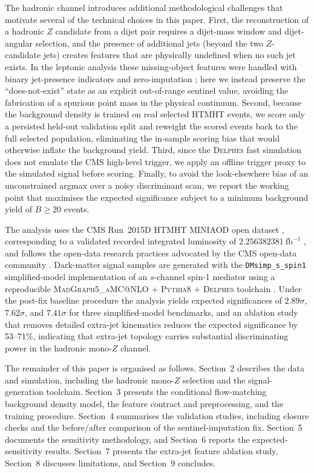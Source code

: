 \documentclass[11pt,a4paper,twocolumn]{article}
\newcommand{\invfb}{\ensuremath{\mathrm{fb}^{-1}}}
\begin{document}
The hadronic channel introduces additional methodological challenges that
motivate several of the technical choices in this paper. First, the
reconstruction of a hadronic $Z$ candidate from a dijet pair requires a
dijet-mass window and dijet-angular selection, and the presence of additional
jets (beyond the two $Z$-candidate jets) creates features that are
physically undefined when no such jet exists. In the leptonic analysis these
missing-object features were handled with binary jet-presence indicators and
zero-imputation \cite{rasineni_nsf_monoz}; here we instead preserve the
``does-not-exist'' state as an explicit out-of-range sentinel value, avoiding
the fabrication of a spurious point mass in the physical continuum. Second,
because the background density is trained on real selected HTMHT events, we
score only a persisted held-out validation split and reweight the scored
events back to the full selected population, eliminating the in-sample
scoring bias that would otherwise inflate the background yield. Third, since
the \textsc{Delphes} fast simulation does not emulate the CMS high-level
trigger, we apply an offline trigger proxy to the simulated signal before
scoring. Finally, to avoid the look-elsewhere bias of an unconstrained
argmax over a noisy discriminant scan, we report the working point that
maximises the expected significance subject to a minimum background yield of
$B\geq20$ events.

The analysis uses the CMS Run~2015D HTMHT MINIAOD open dataset
\cite{cms_htmht_2015d}, corresponding to a validated recorded integrated
luminosity of $2.256382381~\invfb$ \cite{cms_data_policy,cms_lumi_guide},
and follows the open-data research practices advocated by the CMS open-data
community \cite{lassila_cms_opendata,bellis_cms_dp}. Dark-matter signal
samples are generated with the \texttt{DMsimp\_s\_spin1} simplified-model
implementation of an $s$-channel spin-1 mediator
\cite{abercrombie_dm_forum,backovic_schannel} using a reproducible
\textsc{MadGraph5\_aMC@NLO} + \textsc{Pythia8} + \textsc{Delphes} toolchain
\cite{alwall_mg5amc,sjostrand_pythia82,delphes3}. Under the post-fix
baseline procedure the analysis yields expected significances of
$2.89\sigma$, $7.62\sigma$, and $7.41\sigma$ for three simplified-model
benchmarks, and an ablation study that removes detailed extra-jet kinematics
reduces the expected significance by 53--71\%, indicating that extra-jet
topology carries substantial discriminating power in the hadronic mono-$Z$
channel.

The remainder of this paper is organised as follows. Section~2 describes the
data and simulation, including the hadronic mono-$Z$ selection and the
signal-generation toolchain. Section~3 presents the conditional flow-matching
background density model, the feature contract and preprocessing, and the
training procedure. Section~4 summarises the validation studies, including
closure checks and the before/after comparison of the sentinel-imputation
fix. Section~5 documents the sensitivity methodology, and Section~6 reports
the expected-sensitivity results. Section~7 presents the extra-jet feature
ablation study, Section~8 discusses limitations, and Section~9 concludes.
\end{document}
